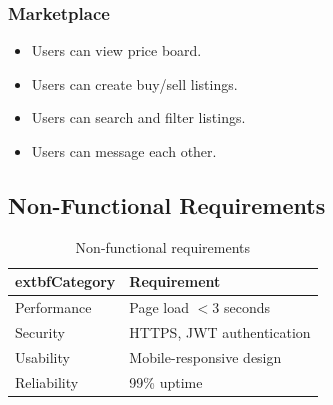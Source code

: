 \subsubsection{Marketplace}
\begin{itemize}[leftmargin=*]
	\item Users can view price board.
	\item Users can create buy/sell listings.
	\item Users can search and filter listings.
	\item Users can message each other.
\end{itemize}

\subsection{Non-Functional Requirements}
\begin{table}[H]
	\centering
	\begin{tabular}{|l|l|}
		\hline
			extbf{Category} & \textbf{Requirement} \\
		\hline
		Performance & Page load $< 3$ seconds \\
		Security & HTTPS, JWT authentication \\
		Usability & Mobile-responsive design \\
		Reliability & 99\% uptime \\
		\hline
	\end{tabular}
	\caption{Non-functional requirements}
	\label{tab:nfr}
\end{table}
